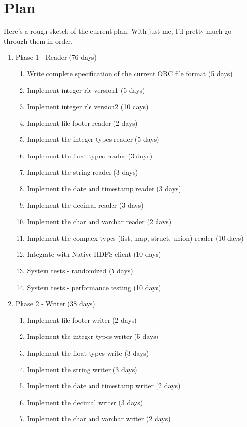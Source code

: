 \documentclass{article}
\begin{document}
\section{Plan}

Here's a rough sketch of the current plan. With just me, I'd pretty
much go through them in order.

\begin{enumerate}
\item{Phase 1 - Reader (76 days)}
  \begin{enumerate}
  \item Write complete specification of the current ORC file format (5 days)
  \item Implement integer rle version1 (5 days)
  \item Implement integer rle version2 (10 days)
  \item Implement file footer reader (2 days)
  \item Implement the integer types reader (5 days)
  \item Implement the float types reader (3 days)
  \item Implement the string reader (3 days)
  \item Implement the date and timestamp reader (3 days)
  \item Implement the decimal reader (3 days)
  \item Implement the char and varchar reader (2 days)
  \item Implement the complex types (list, map, struct, union) reader (10 days)
  \item Integrate with Native HDFS client (10 days)
  \item System tests - randomized (5 days)
  \item System tests - performance testing (10 days)
  \end{enumerate}
\item{Phase 2 - Writer (38 days)}
  \begin{enumerate}
  \item Implement file footer writer (2 days)
  \item Implement the integer types writer (5 days)
  \item Implement the float types write (3 days)
  \item Implement the string writer (3 days)
  \item Implement the date and timestamp writer (2 days)
  \item Implement the decimal writer (3 days)
  \item Implement the char and varchar writer (2 days)

\end{enumerate}
\end{enumerate}
\end{document}
